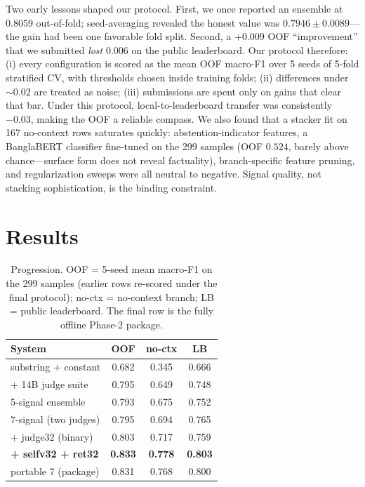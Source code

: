 \documentclass[11pt]{article}
\begin{document}
Two early lessons shaped our protocol. First, we once reported an ensemble at
$0.8059$ out-of-fold; seed-averaging revealed the honest value was
$0.7946 \pm 0.0089$---the gain had been one favorable fold split. Second, a
$+0.009$ OOF ``improvement'' that we submitted \emph{lost} 0.006 on the public
leaderboard. Our protocol therefore: (i) every configuration is scored as the
mean OOF macro-F1 over 5 seeds of 5-fold stratified CV, with thresholds chosen
inside training folds; (ii) differences under ${\sim}0.02$ are treated as
noise; (iii) submissions are spent only on gains that clear that bar. Under
this protocol, local-to-leaderboard transfer was consistently $-0.03$, making
the OOF a reliable compass. We also found that a stacker fit on 167
no-context rows saturates quickly: abstention-indicator features, a
BanglaBERT classifier fine-tuned on the 299 samples (OOF $0.524$, barely
above chance---surface form does not reveal factuality), branch-specific
feature pruning, and regularization sweeps were all neutral to negative.
Signal quality, not stacking sophistication, is the binding constraint.

\section{Results}

\begin{table}[t]
\centering
\small
\begin{tabular}{lccc}
\toprule
System & OOF & no-ctx & LB \\
\midrule
substring + constant & 0.682 & 0.345 & 0.666 \\
+ 14B judge suite & 0.795 & 0.649 & 0.748 \\
5-signal ensemble & 0.793 & 0.675 & 0.752 \\
7-signal (two judges) & 0.795 & 0.694 & 0.765 \\
+ judge32 (binary) & 0.803 & 0.717 & 0.759 \\
\textbf{+ selfv32 + ret32} & \textbf{0.833} & \textbf{0.778} & \textbf{0.803} \\
\midrule
portable 7 (package) & 0.831 & 0.768 & 0.800 \\
\bottomrule
\end{tabular}
\caption{Progression. OOF = 5-seed mean macro-F1 on the 299 samples
(earlier rows re-scored under the final protocol); no-ctx = no-context branch;
LB = public leaderboard. The final row is the fully offline Phase-2 package.}
\label{tab:results}
\end{table}
\end{document}
